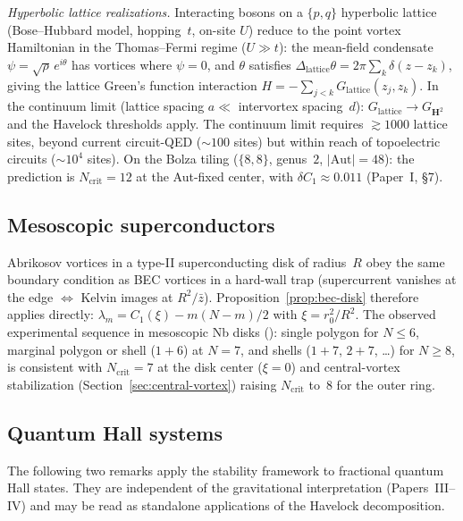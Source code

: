 \emph{Hyperbolic lattice realizations.}
Interacting bosons on a $\{p,q\}$ hyperbolic lattice
(Bose--Hubbard model, hopping~$t$, on-site $U$) reduce
to the point vortex Hamiltonian in the Thomas--Fermi
regime ($U \gg t$):
the mean-field condensate $\psi = \sqrt{\rho}\,e^{i\theta}$
has vortices where $\psi = 0$, and $\theta$ satisfies
$\Delta_{\mathrm{lattice}}\theta = 2\pi\sum_k \delta(z{-}z_k)$,
giving the lattice Green's function interaction
$H = -\sum_{j<k} G_{\mathrm{lattice}}(z_j, z_k)$.
In the continuum limit (lattice spacing $a \ll$ intervortex
spacing~$d$): $G_{\mathrm{lattice}} \to G_{\mathbf{H}^2}$
and the Havelock thresholds apply.
The continuum limit requires $\gtrsim 1000$ lattice
sites, beyond current circuit-QED
($\sim\!100$ sites) but within reach of topoelectric
circuits ($\sim\!10^4$ sites).
On the Bolza tiling ($\{8,8\}$, genus~$2$,
$|\mathrm{Aut}| = 48$): the prediction is
$N_{\mathrm{crit}} = 12$ at the Aut-fixed center,
with $\delta C_1 \approx 0.011$ (Paper~I, \S7).

\subsection{Mesoscopic superconductors}

\begin{remark}
\label{rmk:superconductor}
Abrikosov vortices in a type-II superconducting disk of
radius~$R$ obey the same boundary condition as BEC
vortices in a hard-wall trap (supercurrent vanishes at the
edge $\Leftrightarrow$ Kelvin images at $R^2/\bar{z}$).
Proposition~\ref{prop:bec-disk} therefore applies directly:
$\lambda_m = C_1(\xi) - m(N{-}m)/2$ with $\xi = r_0^2/R^2$.
The observed experimental sequence in mesoscopic Nb disks
(\citealt{Grigorieva2006}):
single polygon for $N \le 6$, marginal polygon or shell
($1{+}6$) at $N = 7$, and shells ($1{+}7$, $2{+}7$, \ldots)
for $N \ge 8$, is consistent with $N_{\mathrm{crit}} = 7$
at the disk center ($\xi = 0$) and central-vortex
stabilization (Section~\ref{sec:central-vortex}) raising
$N_{\mathrm{crit}}$ to~$8$ for the outer ring.
\end{remark}

\subsection{Quantum Hall systems}
The following two remarks apply the stability framework to
fractional quantum Hall states. They are independent of the
gravitational interpretation (Papers~III--IV) and may be
read as standalone applications of the Havelock decomposition.

